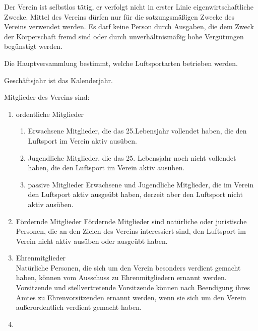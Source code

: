 \documentclass[10pt,a4paper,parskip=half]{scrartcl}
\providecommand{\DIFaddtex}[1]{{\protect\color{blue}\uwave{#1}}} %
\providecommand{\DIFaddbegin}{} %
\providecommand{\DIFaddend}{} %
\providecommand{\DIFadd}[1]{\texorpdfstring{\DIFaddtex{#1}}{#1}} %
\newcommand{\DIFaddincludegraphics}[2][]{{\color{blue}\fbox{\DIFOincludegraphics[#1]{#2}}}} %
\DeclareRobustCommand{\DIFaddbegin}{\DIFOaddbegin \let\includegraphics\DIFaddincludegraphics} %
\DeclareRobustCommand{\DIFaddend}{\DIFOaddend \let\includegraphics\DIFOincludegraphics} %
\begin{document}
\begin{contract}
    Der Verein ist selbstlos tätig,
    er verfolgt nicht in erster Linie eigenwirtschaftliche Zwecke.
    Mittel des Vereins dürfen nur für die satzungsmäßigen Zwecke des Vereins verwendet werden.
    Es darf keine Person durch Ausgaben,
    die dem Zweck der Körperschaft fremd sind oder durch unverhältnismäßig hohe Vergütungen begünstigt werden.

    Die Hauptversammlung bestimmt,
    welche Luftsportarten betrieben werden.

    Geschäftsjahr ist das Kalenderjahr.

    \label{C:Mitglieder}

    Mitglieder des Vereins sind:
    \begin{enumerate}
      \item ordentliche Mitglieder
            \begin{enumerate}
              \item Erwachsene Mitglieder,
                    die das 25.Lebensjahr vollendet haben,
                    die den Luftsport im Verein aktiv
                    ausüben. \label{S:OrdentlicheMitglieder:Erwachsene}
              \item Jugendliche Mitglieder,
                    die das 25. Lebensjahr noch nicht vollendet haben,
                    die den Luftsport im Verein aktiv ausüben. \label{S:OrdentlicheMitglieder:Jugendliche}
              \item{passive Mitglieder} Erwachsene und Jugendliche Mitglieder,
                    die im Verein den Luftsport aktiv ausgeübt haben,
                    derzeit aber den Luftsport nicht aktiv ausüben.
            \end{enumerate}
      \item{Fördernde Mitglieder} Fördernde Mitglieder sind natürliche oder juristische Personen,
            die an den Zielen des Vereins interessiert sind,
            den Luftsport im Verein nicht aktiv ausüben oder ausgeübt haben.

      \item{Ehrenmitglieder}\\
            Natürliche Personen,
            die sich um den Verein besonders verdient gemacht haben,
            können vom Ausschuss zu Ehrenmitgliedern ernannt werden.
            Vorsitzende und stellvertretende Vorsitzende können nach Beendigung ihres Amtes zu Ehrenvorsitzenden ernannt werden,
            wenn sie sich um den Verein außerordentlich verdient gemacht haben.
      \DIFaddbegin \item \DIFadd{Mitglieder auf Probe}\label{S:MitgliederAufProbe}
    \DIFaddend \end{enumerate}\label{S:OrdentlicheMitglieder}


\end{contract}
\end{document}
